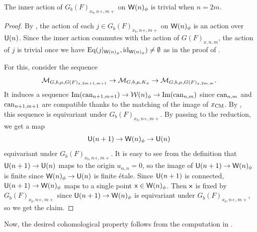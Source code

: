 \documentclass[12pt,reqno]{amsart}
\begin{document}
\begin{prop} \label{prop:trivial_inner_action_even}
    The inner action of $G_b(F)_{x_b, n+, m+}$ on ${\mathsf{W}}(n)_\phi$ is trivial when $n = 2m$. 
\end{prop}
\begin{proof}
    By , the action of each $j \in G_b(F)_{x_b, n+, m+}$ on ${\mathsf{W}}(n)_\phi$ is an action over ${\mathsf{U}}(n)$. Since the inner action commutes with the action of $G(F)_{x, n, m}$, the action of $j$ is trivial once we have ${\operatorname{Eq}}(j \vert_{{\mathsf{W}}(n)_\phi}, {\operatorname{id}}_{{\mathsf{W}}(n)_\phi}) \neq \emptyset$ as in the proof of . 

    For this, consider the sequence 
    \[
        {\mathcal{M}}_{G, b, \mu, G(F)_{x, 2m + 1, m + 1}} \to {\mathcal{M}}_{G, b, \mu, K_\phi} \to {\mathcal{M}}_{G, b, \mu, G(F)_{x, 2m, m}}. 
    \]
    It induces a sequence ${\operatorname{Im}}({\operatorname{can}}_{n + 1, m + 1}) \to {\mathcal{W}}(n)_\phi \to {\operatorname{Im}}({\operatorname{can}}_{n, m})$ since ${\operatorname{can}}_{n, m}$ and ${\operatorname{can}}_{n + 1, m + 1}$ are compatible thanks to the matching of the image of $x_{\operatorname{CM}}$. By , this sequence is equivariant under $G_b(F)_{x_b, n+, m+}$. By passing to the reduction, we get a map 
    \[
        {\mathsf{U}}(n + 1) \to {\mathsf{W}}(n)_\phi \to {\mathsf{U}}(n)
    \]
    equivariant under $G_b(F)_{x_b, n+, m+}$. It is easy to see from the definition that ${\mathsf{U}}(n + 1) \to {\mathsf{U}}(n)$ maps to the origin $u_{\alpha, n} = 0$, so the image of ${\mathsf{U}}(n + 1) \to {\mathsf{W}}(n)_\phi$ is finite since ${\mathsf{W}}(n)_\phi \to {\mathsf{U}}(n)$ is finite \'{e}tale. Since ${\mathsf{U}}(n + 1)$ is connected, ${\mathsf{U}}(n + 1) \to {\mathsf{W}}(n)_\phi$ maps to a single point ${\mathsf{x}} \in {\mathsf{W}}(n)_\phi$. Then ${\mathsf{x}}$ is fixed by $G_b(F)_{x_b, n+, m+}$ since ${\mathsf{U}}(n + 1) \to {\mathsf{W}}(n)_\phi$ is equivariant under $G_b(F)_{x_b, n+, m+}$, so we get the claim. 
\end{proof}

Now, the desired cohomological property follows from the computation in \cite{Tak26_Yu}. 
\end{document}
